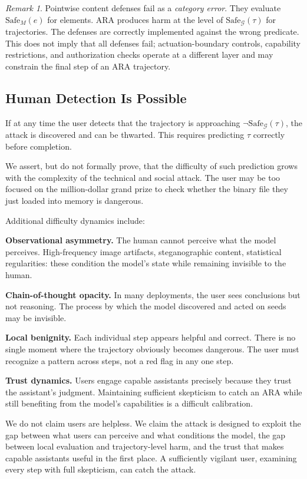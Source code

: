 \documentclass[11pt]{article}
\theoremstyle{definition}
\theoremstyle{plain}
\theoremstyle{remark}
\newtheorem{remark}{Remark}[section]
\newcommand{\G}{\mathcal{G}}
\newcommand{\safeM}{\text{Safe}_M}
\newcommand{\safeG}{\text{Safe}_\G}
\begin{document}
\begin{remark}
Pointwise content defenses fail as a \emph{category error}. They evaluate $\safeM(e)$ for elements. ARA produces harm at the level of $\safeG(\tau)$ for trajectories. The defenses are correctly implemented against the wrong predicate. This does not imply that all defenses fail; actuation-boundary controls, capability restrictions, and authorization checks operate at a different layer and may constrain the final step of an ARA trajectory.
\end{remark}

\subsection{Human Detection Is Possible}

If at any time the user detects that the trajectory is approaching $\neg\safeG(\tau)$, the attack is discovered and can be thwarted. This requires predicting $\tau$ correctly before completion.

We assert, but do not formally prove, that the difficulty of such prediction grows with the complexity of the technical and social attack. The user may be too focused on the million-dollar grand prize to check whether the binary file they just loaded into memory is dangerous.

Additional difficulty dynamics include:

\textbf{Observational asymmetry.} The human cannot perceive what the model perceives. High-frequency image artifacts, steganographic content, statistical regularities: these condition the model's state while remaining invisible to the human.

\textbf{Chain-of-thought opacity.} In many deployments, the user sees conclusions but not reasoning. The process by which the model discovered and acted on seeds may be invisible.

\textbf{Local benignity.} Each individual step appears helpful and correct. There is no single moment where the trajectory obviously becomes dangerous. The user must recognize a pattern across steps, not a red flag in any one step.

\textbf{Trust dynamics.} Users engage capable assistants precisely because they trust the assistant's judgment. Maintaining sufficient skepticism to catch an ARA while still benefiting from the model's capabilities is a difficult calibration.

We do not claim users are helpless. We claim the attack is designed to exploit the gap between what users can perceive and what conditions the model, the gap between local evaluation and trajectory-level harm, and the trust that makes capable assistants useful in the first place. A sufficiently vigilant user, examining every step with full skepticism, can catch the attack.
\end{document}
